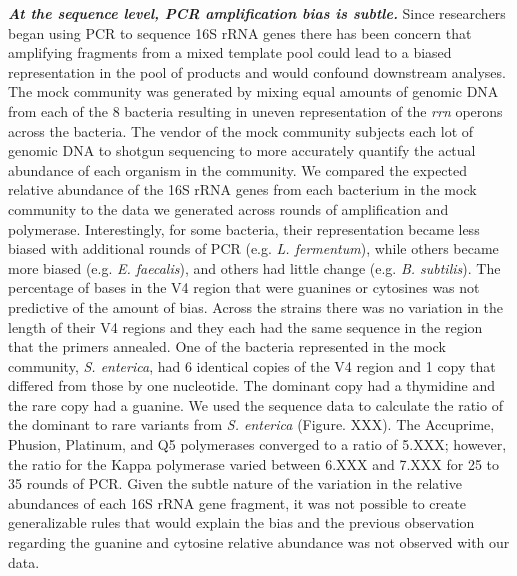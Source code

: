\documentclass[11,]{article}
\begin{document}
\textbf{\emph{At the sequence level, PCR amplification bias is subtle.}}
Since researchers began using PCR to sequence 16S rRNA genes there has
been concern that amplifying fragments from a mixed template pool could
lead to a biased representation in the pool of products and would
confound downstream analyses. The mock community was generated by mixing
equal amounts of genomic DNA from each of the 8 bacteria resulting in
uneven representation of the \emph{rrn} operons across the bacteria. The
vendor of the mock community subjects each lot of genomic DNA to shotgun
sequencing to more accurately quantify the actual abundance of each
organism in the community. We compared the expected relative abundance
of the 16S rRNA genes from each bacterium in the mock community to the
data we generated across rounds of amplification and polymerase.
Interestingly, for some bacteria, their representation became less
biased with additional rounds of PCR (e.g. \emph{L. fermentum}), while
others became more biased (e.g. \emph{E. faecalis}), and others had
little change (e.g. \emph{B. subtilis}). The percentage of bases in the
V4 region that were guanines or cytosines was not predictive of the
amount of bias. Across the strains there was no variation in the length
of their V4 regions and they each had the same sequence in the region
that the primers annealed. One of the bacteria represented in the mock
community, \emph{S. enterica}, had 6 identical copies of the V4 region
and 1 copy that differed from those by one nucleotide. The dominant copy
had a thymidine and the rare copy had a guanine. We used the sequence
data to calculate the ratio of the dominant to rare variants from
\emph{S. enterica} (Figure. XXX). The Accuprime, Phusion, Platinum, and
Q5 polymerases converged to a ratio of 5.XXX; however, the ratio for the
Kappa polymerase varied between 6.XXX and 7.XXX for 25 to 35 rounds of
PCR. Given the subtle nature of the variation in the relative abundances
of each 16S rRNA gene fragment, it was not possible to create
generalizable rules that would explain the bias and the previous
observation regarding the guanine and cytosine relative abundance was
not observed with our data.
\end{document}
